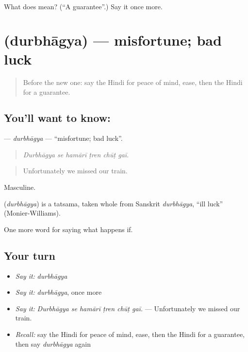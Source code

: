 \begin{tcolorbox}[breakable,colback=teal!4,colframe=teal!35!black,title={Before you move on}]
What does  mean? (\textquotedblleft{}A guarantee\textquotedblright{}.) Say it once more.
\end{tcolorbox}
\section[\texorpdfstring{\hi{दुर्भाग्य} (durbhāgya)}{दुर्भाग्य (durbhāgya)}]{ (durbhāgya) — misfortune; bad luck}

\label{lesson:HI-C557-durbhagya}



\begin{quote}
Before the new one: say the Hindi for peace of mind, ease, then the Hindi for a guarantee.
\end{quote}

\subsection*{You'll want to know: }
\textbf{} — \emph{durbhāgya} — \textquotedblleft{}misfortune; bad luck\textquotedblright{}.

\begin{quote}
     
\end{quote}

\begin{quote}
\emph{Durbhāgya se hamārī ṭren chūṭ gaī.}
\end{quote}

\begin{quote}
Unfortunately we missed our train.
\end{quote}

Masculine.

\begin{cousinweb}
\textbf{} (\emph{durbhāgya}) is a tatsama, taken whole from Sanskrit \emph{durbhāgya}, \textquotedblleft{}ill luck\textquotedblright{} (Monier-Williams).
\end{cousinweb}

\begin{grammarlens}[title={What you've built}]
One more word for saying what happens if.
\end{grammarlens}

\subsection*{Your turn}
\begin{itemize}
\raggedright
  \item \emph{Say it:} \emph{durbhāgya}
  \item \emph{Say it:} \emph{durbhāgya}, once more
  \item \emph{Say it:} \emph{Durbhāgya se hamārī ṭren chūṭ gaī.} — Unfortunately we missed our train.
  \item \emph{Recall:} say the Hindi for peace of mind, ease, then the Hindi for a guarantee, then say \emph{durbhāgya} again
\end{itemize}

